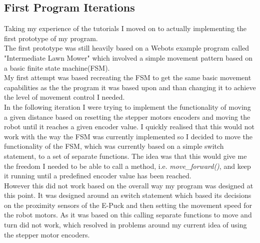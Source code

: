 \documentclass[10pt,a4paper]{article}
\begin{document}
\begin{flushleft}
\subsection{First Program Iterations}
Taking my experience of the tutorials I moved on to actually implementing the first prototype of my program. \\
The first prototype was still heavily based on a Webots example program called "Intermediate Lawn Mower" which involved a simple movement pattern based on a basic finite state machine(FSM). \\ My first attempt was based recreating the FSM to get the same basic movement capabilities as the the program it was based upon and than changing it to achieve the level of movement control I needed. \\[3ex]

In the following iteration I were trying to implement the functionality of moving a given distance based on resetting the stepper motors encoders and moving the robot until it reaches a given encoder value. I quickly realised that this would not work with the way the FSM was currently implemented so I decided to move the functionality of the FSM, which was currently based on a simple switch statement, to a set of separate functions. The idea was that this would give me the freedom I needed to be able to call a method, i.e. \textit{move\_forward()},  and keep it running until a predefined encoder value has been reached. \\
However this did not work based on the overall way my program was designed at this point. It was designed around an switch statement which based its decisions on the proximity sensors of the E-Puck and then setting the movement speed for the robot motors. As it was based on this calling separate functions to move and turn did not work, which resolved in problems around my current idea of using the stepper motor encoders. \\[3ex] 


\end{flushleft}
\end{document}
